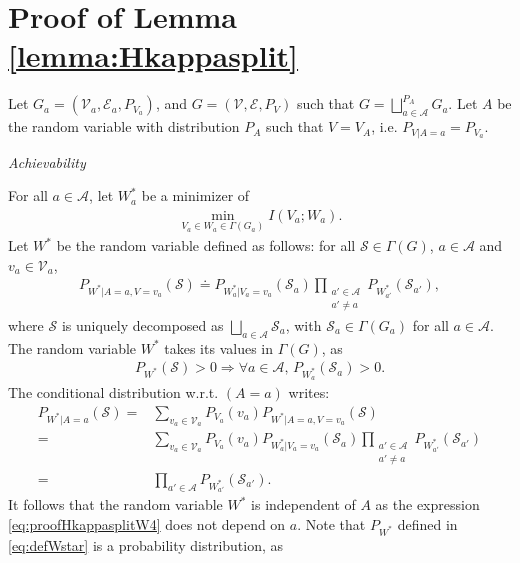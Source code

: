 \documentclass[conference,a4paper]{IEEEtran}
\begin{document}
\section{Proof of Lemma \ref{lemma:Hkappasplit}}\label{section:prooflemmaHkappasplit}
Let $G_a = (\mathcal{V}_a, \mathcal{E}_a, P_{V_a})$, and $G = (\mathcal{V}, \mathcal{E},P_{V})$ such that $G = \bigsqcup_{a \in \mathcal{A}}^{P_A} G_a$. Let $A$ be the random variable with distribution $P_A$ such that $V = V_A$, i.e. $P_{V|A = a} = P_{V_a}$.\newline

\textit{Achievability}

For all $a \in \mathcal{A}$, let $W^*_a$ be a minimizer of
\begin{align}
    \min_{V_a \in W_a \in \Gamma(G_a)} I(V_a;W_a).\label{eq:defWastar}
\end{align}
Let $W^*$ be the random variable defined as follows: for all $\mathcal{S} \in \Gamma(G)$, $a \in \mathcal{A}$ and $v_a \in \mathcal{V}_a$,
\begin{align}
    P_{W^*| A = a, V = v_a}(\mathcal{S}) \doteq P_{W^*_a|V_a = v_a}(\mathcal{S}_a) \prod_{\substack{a' \in \mathcal{A} \\ a' \neq a}} P_{W^*_{a'}}(\mathcal{S}_{a'}), \label{eq:defWstar}
\end{align}
where $\mathcal{S}$ is uniquely decomposed as $\bigsqcup_{a \in \mathcal{A}} \mathcal{S}_a$, with $\mathcal{S}_a \in \Gamma(G_a)$ for all $a \in \mathcal{A}$. The random variable $W^*$ takes its values in $\Gamma(G)$, as
\begin{align}
    P_{W^*}(\mathcal{S}) > 0 \Longrightarrow \forall a \in \mathcal{A}, \, P_{W^*_a}(\mathcal{S}_a) > 0.
\end{align}
The conditional distribution w.r.t. $(A = a)$ writes:
\begin{align}
    P_{W^*| A = a}(\mathcal{S}) = & \sum_{v_a \in \mathcal{V}_a} P_{V_a}(v_a) P_{W^*| A = a, V = v_a}(\mathcal{S}) \label{eq:proofHkappasplitW2}\\
    = & \sum_{v_a \in \mathcal{V}_a} P_{V_a}(v_a) P_{W^*_a|V_a = v_a}(\mathcal{S}_a) \prod_{\substack{a' \in \mathcal{A} \\ a' \neq a}} P_{W^*_{a'}}(\mathcal{S}_{a'}) \label{eq:proofHkappasplitW3}\\
    = & \prod_{a' \in \mathcal{A}} P_{W^*_{a'}}(\mathcal{S}_{a'}). \label{eq:proofHkappasplitW4}
\end{align}
It follows that the random variable $W^*$ is independent of $A$ as the expression \eqref{eq:proofHkappasplitW4} does not depend on $a$. Note that $P_{W^*}$ defined in \eqref{eq:defWstar} is a probability distribution, as 
\end{document}
